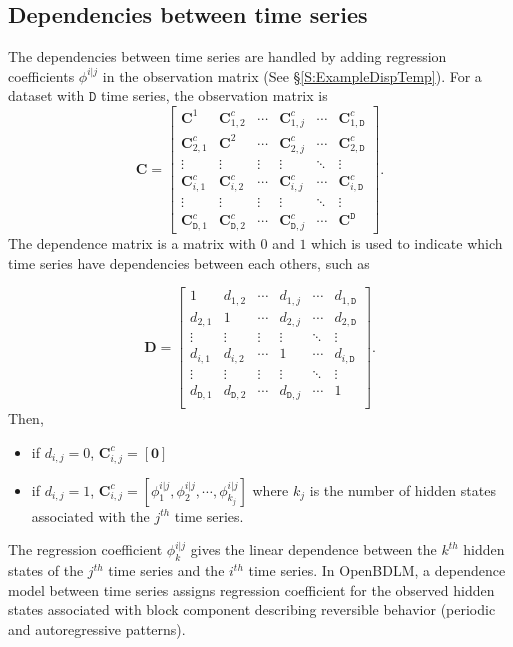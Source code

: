 \subsection{Dependencies between time series}
\label{S:Dependencies}
The dependencies between time series are handled by adding regression coefficients $\phi^{i|j}$ in the observation matrix (See \S\ref{S:ExampleDispTemp}).
For a dataset with $\mathtt{D}$ time series, the observation matrix is
\begin{equation*}
\mathbf{C}=\left[\begin{array}{cccccc}
\mathbf{C}^{1}& \mathbf{C}_{1,2}^{c}&\cdots & \mathbf{C}_{1,j}^{c}&\cdots& \mathbf{C}_{1,\mathtt{D}}^{c}\\
\mathbf{C}_{2,1}^{c}& \mathbf{C}^{2}&\cdots& \mathbf{C}_{2,j}^{c}&\cdots& \mathbf{C}_{2,\mathtt{D}}^{c}\\
\vdots&\vdots& \vdots& \vdots& \ddots& \vdots\\
\mathbf{C}_{i,1}^{c}& \mathbf{C}_{i,2}^{c}&\cdots&\mathbf{C}_{i,j}^{c}&\cdots&\mathbf{C}_{i,\mathtt{D}}^{c}\\
\vdots&\vdots& \vdots& \vdots& \ddots& \vdots\\
\mathbf{C}_{\mathtt{D},1}^{c}& \mathbf{C}_{\mathtt{D},2}^{c}&\cdots& \mathbf{C}_{\mathtt{D},j}^{c}&\cdots& \mathbf{C}^{\mathtt{D}}
\end{array}\right] \text{.}
\end{equation*}
The dependence matrix is a matrix with $0$ and $1$ which is used to indicate which time series have dependencies between each others, such as 

\begin{equation*}
\mathbf{D}=\left[\begin{array}{cccccc}
1&d_{1,2}&\cdots&d_{1,j}&\cdots&d_{1,\mathtt{D}}\\
d_{2,1}&1&\cdots&d_{2,j}&\cdots&d_{2,\mathtt{D}}\\
\vdots&\vdots&\vdots&\vdots&\ddots&\vdots\\
d_{i,1}&d_{i,2}&\cdots&1&\cdots&d_{i,\mathtt{D}}\\
\vdots&\vdots&\vdots&\vdots&\ddots&\vdots\\
d_{\mathtt{D},1}&d_{\mathtt{D},2}&\cdots&d_{\mathtt{D},j}&\cdots&1\\
\end{array}\right] \text{.}
\end{equation*}
Then, 
\begin{itemize}
\item if $d_{i,j}=0$, $\mathbf{C}_{i,j}^{c}=[\mathbf{0}]$
\item if $d_{i,j}=1$, $\mathbf{C}_{i,j}^{c}=\left[\phi^{i|j}_{1},\phi^{i|j}_{2},\cdots,\phi^{i|j}_{k_{j}}\right]$ where $k_{j}$ is the number of hidden states associated with the $j^{th}$ time series.
\end{itemize}
The regression coefficient $\phi^{i|j}_{k}$ gives the linear dependence between the $k^{th}$ hidden states of the $j^{th}$ time series and the $i^{th}$ time series.
In OpenBDLM, a dependence model between time series assigns regression coefficient for the observed hidden states associated with block component describing reversible behavior (periodic and autoregressive patterns).
